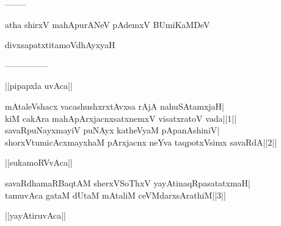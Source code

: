 \documentclass{article}
\begin{document}
\begin{center}
--------
\end{center}

\begin{center}
atha shirxV mahApurANeV pAdemxV BUmiKaMDeV
\end{center}

\begin{center}
divxsapatxtitamoVdhAyxyaH
\end{center}

\begin{center}

---------------
\end{center}

\begin{center}
||pipapxla uvAca||
\end{center}

mAtaleVshacx vacashushxrxtAvxsa rAjA nahuSAtamxjaH|\\
kiM cakAra mahApArxjacnxsatxnemxV visatxratoV vada||1||\\
savaRpuNayxmayiV puNAyx katheVyaM pApanAshiniV|\\
shorxVtumicAcxmayxhaM pArxjacnx neYva taqpotxVsimx savaRdA||2||\\

\begin{center}
||sukamoRVvAca||
\end{center}

savaRdhamaRBaqtAM sherxVSoThxV yayAtinaqRpasatatxmaH|\\
tamuvAca gataM dUtaM mAtaliM ceVMdarxsArathiM||3||\\

\begin{center}
||yayAtiruvAca||
\end{center}
\end{document}
